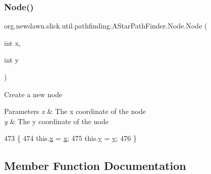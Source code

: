 \subsubsection{\texorpdfstring{Node()}{Node()}}
{\footnotesize\ttfamily org.\+newdawn.\+slick.\+util.\+pathfinding.\+A\+Star\+Path\+Finder.\+Node.\+Node (\begin{DoxyParamCaption}\item[{int}]{x,  }\item[{int}]{y }\end{DoxyParamCaption})\hspace{0.3cm}{\ttfamily [inline]}}

Create a new node


\begin{DoxyParams}{Parameters}
{\em x} & The x coordinate of the node \\
\hline
{\em y} & The y coordinate of the node \\
\hline
\end{DoxyParams}

\begin{DoxyCode}
473                                   \{
474             this.\mbox{\hyperlink{classorg_1_1newdawn_1_1slick_1_1util_1_1pathfinding_1_1_a_star_path_finder_1_1_node_ada4322ce47f95ba2707c0b1a03ea0f87}{x}} = \mbox{\hyperlink{classorg_1_1newdawn_1_1slick_1_1util_1_1pathfinding_1_1_a_star_path_finder_1_1_node_ada4322ce47f95ba2707c0b1a03ea0f87}{x}};
475             this.\mbox{\hyperlink{classorg_1_1newdawn_1_1slick_1_1util_1_1pathfinding_1_1_a_star_path_finder_1_1_node_a926a7542d89578d05ea59a6803479355}{y}} = \mbox{\hyperlink{classorg_1_1newdawn_1_1slick_1_1util_1_1pathfinding_1_1_a_star_path_finder_1_1_node_a926a7542d89578d05ea59a6803479355}{y}};
476         \}
\end{DoxyCode}


\subsection{Member Function Documentation}
\mbox{\label{classorg_1_1newdawn_1_1slick_1_1util_1_1pathfinding_1_1_a_star_path_finder_1_1_node_a4d6c5ba4913e77ea1279faa3ec111e3e}} 
